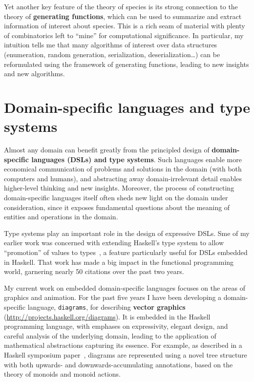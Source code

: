 \documentclass[12pt]{article}
\begin{document}
Yet another key feature of the theory of species is its strong
connection to the theory of \textbf{generating functions}, which can
be used to summarize and extract information of interest about
species.  This is a rich seam of material with plenty of combinatorics
left to ``mine'' for computational significance.  In particular, my
intuition tells me that many algorithms of interest over data
structures (enumeration, random generation, serialization,
deserialization\dots) can be reformulated using the framework of
generating functions, leading to new insights and new algorithms.

\section*{Domain-specific languages and type systems}
\label{sec:edsls}

Almost any domain can benefit greatly from the principled design of
\textbf{domain-specific languages (DSLs) and type systems}.  Such
languages enable more economical communication of problems and
solutions in the domain (with both computers and humans), and
abstracting away domain-irrelevant detail enables higher-level
thinking and new insights.  Moreover, the process of constructing
domain-specific languages itself often sheds new light on the domain
under consideration, since it exposes fundamental questions about the
meaning of entities and operations in the domain.

Type systems play an important role in the design of expressive DSLs.
Sme of my earlier work was concerned with extending Haskell's type
system to allow ``promotion'' of values to
types~\cite{Yorgey2012promotion}, a feature particularly useful for
DSLs embedded in Haskell.  That work has made a big impact in the
functional programming world, garnering nearly 50 citations over the
past two years.

My current work on embedded domain-specific languages focuses on the
areas of graphics and animation.  For the past five years I have been
developing a domain-specific language, \texttt{diagrams}, for
describing \textbf{vector graphics}
(\url{http://projects.haskell.org/diagrams}). It is embedded in the
Haskell programming language, with emphases on expressivity, elegant
design, and careful analysis of the underlying domain, leading to the
application of mathematical abstractions capturing its essence.  For
example, as described in a Haskell symposium
paper~\cite{Yorgey2012monoids}, diagrams are represented using a novel
tree structure with both upwards- and downwards-accumulating
annotations, based on the theory of monoids and monoid actions.
\end{document}
